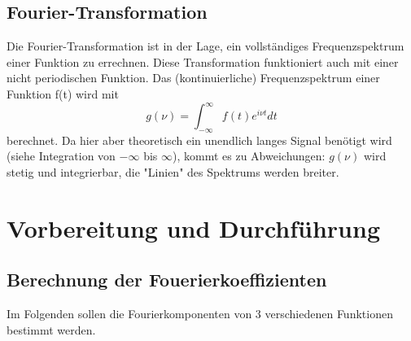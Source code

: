 \documentclass[11pt,ngerman,a4paper]{article}
\begin{document}
\subsection{Fourier-Transformation}
Die Fourier-Transformation ist in der Lage, ein vollständiges Frequenzspektrum einer Funktion zu errechnen. Diese Transformation funktioniert auch mit einer nicht periodischen Funktion. Das (kontinuierliche) Frequenzspektrum einer Funktion f(t) wird mit
\begin{equation}
g(\nu)=\int_{-\infty}^\infty f(t)e^{i\nu t}dt
\label{trafo}
\end{equation}
berechnet. Da hier aber theoretisch ein unendlich langes Signal benötigt wird (siehe Integration von $-\infty$ bis $\infty$), kommt es zu Abweichungen: $g(\nu)$ wird stetig und integrierbar, die "Linien" des Spektrums werden breiter.

\section{Vorbereitung und Durchf\"{u}hrung}
\subsection{Berechnung der Fouerierkoeffizienten}
Im Folgenden sollen die Fourierkomponenten von 3 verschiedenen Funktionen bestimmt werden. 
\end{document}
